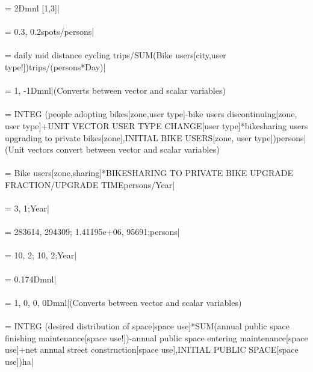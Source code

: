  = {\small 2Dmnl [1,3]|} \\ \\ 
 = {\small 0.3, 0.2spots/persons|} \\ \\ 
 = {\small daily mid distance cycling trips/SUM(Bike users[city,user type!])trips/(persons*Day)|} \\ \\ 
 = {\small 1, -1Dmnl|}{\small  (Converts between vector and scalar variables)} \\ \\ 
 = {\small  INTEG (people adopting bikes[zone,user type]-bike users discontinuing[zone, user type]+UNIT VECTOR USER TYPE CHANGE[user type]*bikesharing users upgrading to private bikes[zone],INITIAL BIKE USERS[zone, user type])persons|}{\small  (Unit vectors convert between vector and scalar variables)} \\ \\ 
 = {\small Bike users[zone,sharing]*BIKESHARING TO PRIVATE BIKE UPGRADE FRACTION/UPGRADE TIMEpersons/Year|} \\ \\ 
 = {\small 3, 1;Year|} \\ \\ 
 = {\small 283614, 294309; 1.41195e+06, 95691;persons|} \\ \\ 
 = {\small 10, 2; 10, 2;Year|} \\ \\ 
 = {\small 0.174Dmnl|} \\ \\ 
 = {\small 1, 0, 0, 0Dmnl|}{\small  (Converts between vector and scalar variables)} \\ \\ 
 = {\small  INTEG (desired distribution of space[space use]*SUM(annual public space finishing maintenance[space use!])-annual public space entering maintenance[space use]+net annual street construction[space use],INITIAL PUBLIC SPACE[space use])ha|} \\ \\ 
